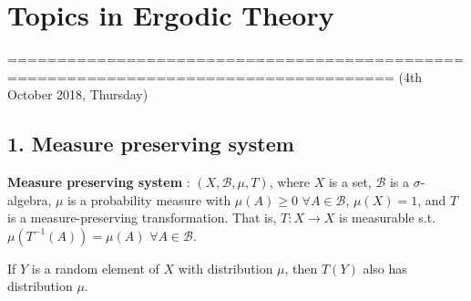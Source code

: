 \documentclass[10pt,a4paper]{report}
\begin{document}
\newcommand{\thm}{\textbf{Theorem) }}
\newcommand{\thmnum}[1]{\textbf{Theorem #1) }}
\newcommand{\defi}{\textbf{Definition) }}
\newcommand{\lem}{\textbf{Lemma) }}
\newcommand{\lemnum}[1]{\textbf{Lemma #1) }}
\newcommand{\prop}{\textbf{Proposition) }}
\newcommand{\pf}{\textbf{proof) }}
\newcommand{\cor}{\textbf{Corollary) }}
\newcommand{\cornum}[1]{\textbf{Corollary #1) }}

\newcommand{\lap}{\triangle} %
\newcommand{\s}{\vspace{10pt}}
\newcommand{\bull}{$\bullet$}
\newcommand{\sta}{$\star$}
\newcommand{\reals}{\mathbb{R}}

\newcommand{\eop}{\hfill  \textsl{(End of proof)} $\square$} %

\newcommand{\intN}{\mathbb{Z}_N}
\newcommand{\norms}[2]{\parallel #1 \parallel_{#2}}
\newcommand{\abs}[1]{\big| #1 \big|}
\newcommand{\avg}{\mathbb{E}}
\newcommand{\borel}{\mathscr{B}}
\newcommand{\setlimsup}[2]{\bigcap_{#1=1}^{\infty}\bigcup_{#2=#1}^{\infty}}
\newcommand{\dlim}{D-\lim}
\newcommand{\clim}{C-\lim}

\newcommand{\newday}{======================================================================}
\newcommand{\digression}{**********************************************************************************************}

\setlength\parindent{0pt}
\noindent

\chapter*{Topics in Ergodic Theory}
\s

=====================================================================================
(4th October 2018, Thursday)
\s

\section*{1. Measure preserving system}

\textbf{Measure preserving system} : $(X, \borel, \mu, T)$, where $X$ is a set, $\borel$ is a $\sigma$-algebra, $\mu$ is a probability measure with $\mu(A) \geq 0$ $\forall A \in \borel$, $\mu(X)=1$, and $T$ is a measure-preserving transformation. That is, $T: X\rightarrow X$ is measurable s.t. $\mu(T^{-1}(A)) = \mu(A)$ $\forall A \in \borel$.
\s

If $Y$ is a random element of $X$ with distribution $\mu$, then $T(Y)$ also has distribution $\mu$.
\s
\end{document}
